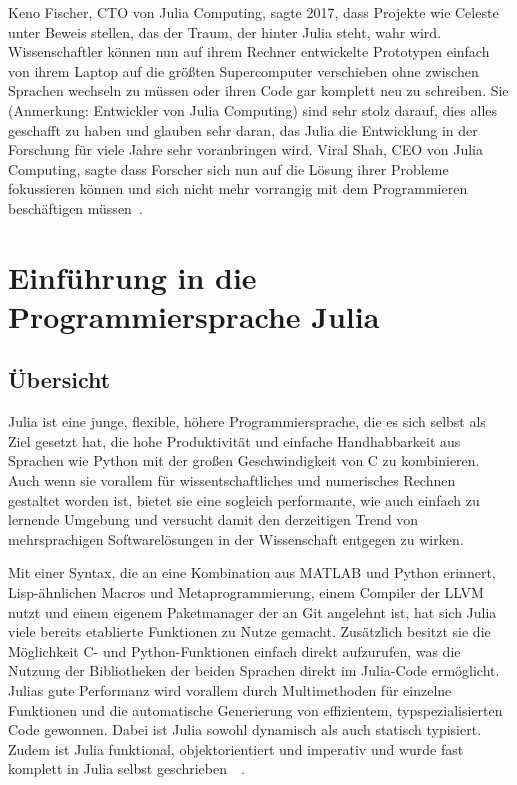 \documentclass[proseminar,german,utf8]{zihpub}
\begin{document}
Keno Fischer, CTO von Julia Computing, sagte 2017, dass Projekte wie Celeste unter Beweis stellen, das der Traum, der hinter Julia steht, wahr wird. Wissenschaftler können nun auf ihrem Rechner entwickelte Prototypen einfach von ihrem Laptop auf die größten Supercomputer verschieben ohne zwischen Sprachen wechseln zu müssen oder ihren Code gar komplett neu zu schreiben. Sie (Anmerkung: Entwickler von Julia Computing) sind sehr stolz darauf, dies alles geschafft zu haben und glauben sehr daran, das Julia die Entwicklung in der Forschung für viele Jahre sehr voranbringen wird. Viral Shah, CEO von Julia Computing, sagte dass Forscher sich nun auf die Lösung ihrer Probleme fokussieren können und sich nicht mehr vorrangig mit dem Programmieren beschäftigen müssen~\cite{CelesteV2}.

\section{Einführung in die Programmiersprache Julia}

\subsection{Übersicht}

Julia ist eine junge, flexible, höhere Programmiersprache, die es sich selbst als Ziel gesetzt hat, die hohe Produktivität und einfache Handhabbarkeit aus Sprachen wie Python mit der großen Geschwindigkeit von C zu kombinieren. Auch wenn sie vorallem für wissentschaftliches und numerisches Rechnen gestaltet worden ist, bietet sie eine sogleich performante, wie auch einfach zu lernende Umgebung und versucht damit den derzeitigen Trend von mehrsprachigen Softwarelösungen in der Wissenschaft entgegen zu wirken. 

Mit einer Syntax, die an eine Kombination aus MATLAB und Python erinnert, Lisp-ähnlichen Macros und Metaprogrammierung, einem Compiler der LLVM nutzt und einem eigenem Paketmanager der an Git angelehnt ist, hat sich Julia viele bereits etablierte Funktionen zu Nutze gemacht. Zusätzlich besitzt sie die Möglichkeit C- und Python-Funktionen einfach direkt aufzurufen, was die Nutzung der Bibliotheken der beiden Sprachen direkt im Julia-Code ermöglicht. Julias gute Performanz wird vorallem durch Multimethoden für einzelne Funktionen und die automatische Generierung von effizientem, typspezialisierten Code gewonnen. Dabei ist Julia sowohl dynamisch als auch statisch typisiert. Zudem ist Julia funktional, objektorientiert und imperativ und wurde fast komplett in Julia selbst geschrieben~\cite{JuliaLangIntro}~\cite{JuliaBasicHeise}. 
\end{document}
